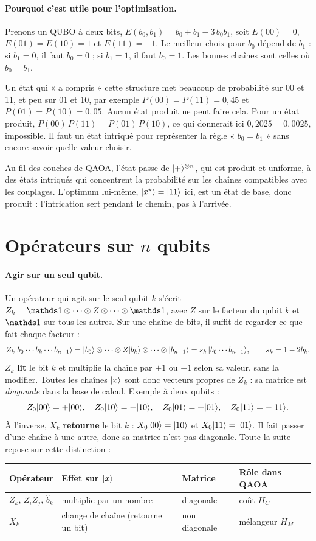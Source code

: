 \paragraph{Pourquoi c'est utile pour l'optimisation.} Prenons un QUBO à deux bits, $E(b_0,b_1)=b_0+b_1-3\,b_0b_1$, soit $E(00)=0$, $E(01)=E(10)=1$ et $E(11)=-1$. Le meilleur choix pour $b_0$ dépend de $b_1$ : si $b_1=0$, il faut $b_0=0$ ; si $b_1=1$, il faut $b_0=1$. Les bonnes chaînes sont celles où $b_0=b_1$.

Un état qui « a compris » cette structure met beaucoup de probabilité sur 00 et 11, et peu sur 01 et 10, par exemple $P(00)=P(11)=0{,}45$ et $P(01)=P(10)=0{,}05$. Aucun état produit ne peut faire cela. Pour un état produit, $P(00)\,P(11)=P(01)\,P(10)$, ce qui donnerait ici $0{,}2025=0{,}0025$, impossible. Il faut un état intriqué pour représenter la règle « $b_0=b_1$ » sans encore savoir quelle valeur choisir.

Au fil des couches de QAOA, l'état passe de $\lvert +\rangle^{\otimes n}$, qui est produit et uniforme, à des états intriqués qui concentrent la probabilité sur les chaînes compatibles avec les couplages. L'optimum lui-même, $\lvert x^\star\rangle=\lvert 11\rangle$ ici, est un état de base, donc produit : l'intrication sert pendant le chemin, pas à l'arrivée.

\section{Opérateurs sur $n$ qubits}
\paragraph{Agir sur un seul qubit.} Un opérateur qui agit sur le seul qubit $k$ s'écrit $Z_k=\Id\otimes\cdots\otimes Z\otimes\cdots\otimes\Id$, avec $Z$ sur le facteur du qubit $k$ et $\Id$ sur tous les autres. Sur une chaîne de bits, il suffit de regarder ce que fait chaque facteur :
\[
Z_k\lvert b_0\cdots b_k\cdots b_{n-1}\rangle=\lvert b_0\rangle\otimes\cdots\otimes Z\lvert b_k\rangle\otimes\cdots\otimes\lvert b_{n-1}\rangle=s_k\,\lvert b_0\cdots b_{n-1}\rangle,\qquad s_k=1-2b_k .
\]
$Z_k$ \textbf{lit} le bit $k$ et multiplie la chaîne par $+1$ ou $-1$ selon sa valeur, sans la modifier. Toutes les chaînes $\lvert x\rangle$ sont donc vecteurs propres de $Z_k$ : sa matrice est \emph{diagonale} dans la base de calcul. Exemple à deux qubits :
\[
Z_0\lvert 00\rangle=+\lvert 00\rangle,\quad Z_0\lvert 10\rangle=-\lvert 10\rangle,\quad Z_0\lvert 01\rangle=+\lvert 01\rangle,\quad Z_0\lvert 11\rangle=-\lvert 11\rangle.
\]
À l'inverse, $X_k$ \textbf{retourne} le bit $k$ : $X_0\lvert 00\rangle=\lvert 10\rangle$ et $X_0\lvert 11\rangle=\lvert 01\rangle$. Il fait passer d'une chaîne à une autre, donc sa matrice n'est pas diagonale. Toute la suite repose sur cette distinction :
\begin{center}
\begin{tabular}{llll}
\toprule
Opérateur & Effet sur $\lvert x\rangle$ & Matrice & Rôle dans QAOA \\
\midrule
$Z_k$, $Z_iZ_j$, $\hat b_k$ & multiplie par un nombre & diagonale & coût $H_C$ \\
$X_k$ & change de chaîne (retourne un bit) & non diagonale & mélangeur $H_M$ \\
\bottomrule
\end{tabular}
\end{center}

